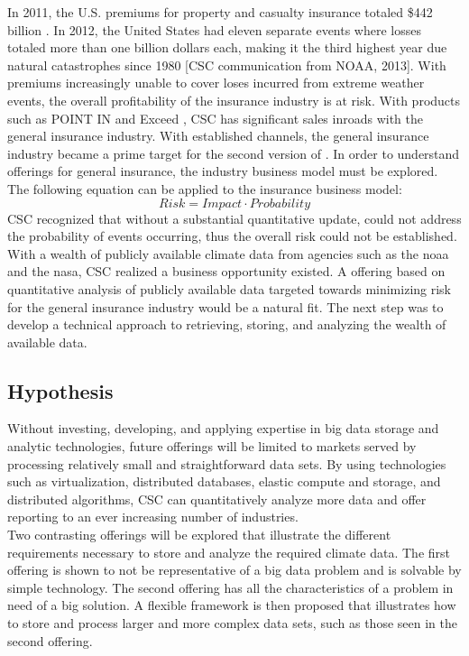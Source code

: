 In 2011, the U.S. premiums for property and casualty insurance totaled \$442 billion \cite{iii}. In 2012, the United States had eleven separate events where losses totaled more than one billion dollars each, making it the third highest year due natural catastrophes since 1980  [\textsc{CSC} communication from NOAA, 2013]. With premiums  increasingly unable to cover loses incurred from extreme weather events, the overall profitability of the insurance industry is at risk. With products such as POINT IN \cite{point_in} and Exceed \cite{exceed}, \textsc{CSC} has significant sales inroads with the general insurance industry. With established channels, the general insurance industry became a prime target for the second version of \climatedge. In order to understand offerings for general insurance, the industry business model must be explored. The following equation can be applied to the insurance  business model: 
\begin{equation*}
    Risk = Impact \cdot Probability
\end{equation*}
\textsc{CSC} recognized that without a substantial quantitative update, \climatedge could not address the probability of events occurring, thus the overall risk could not be established. With a wealth of publicly available climate data from agencies such as the \gls{noaa} and the \gls{nasa}, \textsc{CSC} realized a business opportunity existed. A \climatedge offering based on quantitative analysis of publicly available data targeted towards minimizing risk for the general insurance industry would be a natural fit. The next step was to develop a technical approach to retrieving, storing, and analyzing the wealth of available data. 
\subsection{Hypothesis}
Without investing, developing, and applying expertise in big data  storage and analytic technologies, future \climatedge offerings will be limited to markets served by processing relatively small and straightforward data sets. By using technologies such as virtualization, distributed databases, elastic compute and storage, and distributed algorithms, \textsc{CSC} can quantitatively analyze more data and offer \climatedge reporting to an ever increasing number of industries.\\

Two contrasting \climatedge offerings will be explored that illustrate the different requirements necessary to store and analyze the required climate data. The first offering is shown to not be representative of a big data problem and is solvable by simple technology. The second offering has all the characteristics of a problem in need of a big solution. A flexible framework is then proposed that illustrates how to store and process larger and more complex data sets, such as those seen in the second offering.
